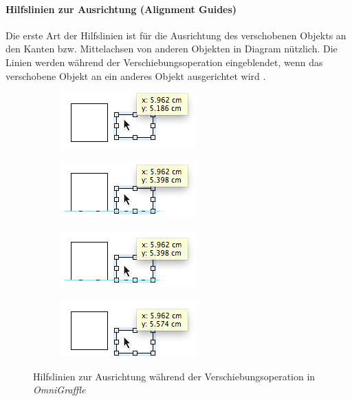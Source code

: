 \paragraph{Hilfslinien zur Ausrichtung (Alignment Guides)}

Die erste Art der Hilfslinien ist für die Ausrichtung des verschobenen Objekts an den Kanten bzw. Mittelachsen von anderen Objekten in Diagram nützlich. Die Linien werden während der Verschiebungsoperation eingeblendet, wenn das verschobene Objekt an ein anderes Objekt ausgerichtet wird \cite{11Keynote}.

\begin{figure}[hbt]
    \newcommand{\subfigurewidth}{0.5\textwidth}
    \begin{subfigure}{\subfigurewidth}
        \centering
        \includegraphics{resources/omnigraffle-smart-guides-a}
        \caption{}
        \label{fig:omnigraffle-smart-guides-a}
    \end{subfigure}
    \begin{subfigure}{\subfigurewidth}
        \centering
        \includegraphics{resources/omnigraffle-smart-guides-b}
        \caption{}
        \label{fig:omnigraffle-smart-guides-b}
    \end{subfigure}
    \begin{subfigure}{\subfigurewidth}
        \centering
        \includegraphics{resources/omnigraffle-smart-guides-c}
        \caption{}
        \label{fig:omnigraffle-smart-guides-c}
    \end{subfigure}
    \begin{subfigure}{\subfigurewidth}
        \centering
        \includegraphics{resources/omnigraffle-smart-guides-d}
        \caption{}
        \label{fig:omnigraffle-smart-guides-d}
    \end{subfigure}
    \caption{Hilfslinien zur Ausrichtung während der Verschiebungsoperation in \textit{OmniGraffle}}
    \label{fig:omnigraffle-smart-guides}
\end{figure}

